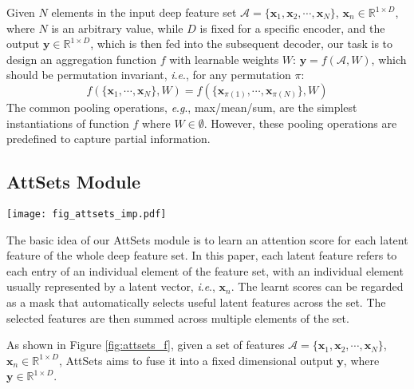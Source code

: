 \documentclass[twocolumn]{svjour3}    \pdfoutput=1
\newcommand{\nickname}{AttSets}
\newcommand{\ie}{\textit{i}.\textit{e}., }
\newcommand{\eg}{\textit{e}.\textit{g}., }
\begin{document}
Given $N$ elements in the input deep feature set $\mathcal{A} = \{\boldsymbol{x}_1, \boldsymbol{x}_2, \cdots, \boldsymbol{x}_N\}$, $\boldsymbol{x}_n \in \mathbb{R}^{1\times D}$, where $N$ is an arbitrary value, while $D$ is fixed for a specific encoder, and the output $\boldsymbol{y} \in \mathbb{R}^{1\times D}$, which is then fed into the subsequent decoder, our task is to design an aggregation function $f$ with learnable weights $\boldsymbol{\mathit{W}}$: $\boldsymbol{y} = f(\mathcal{A}, \boldsymbol{\mathit{W}})$, which should be permutation invariant, \ie for any permutation $\pi$:
\begin{equation}
f(\{ \boldsymbol{x}_1, \cdots, \boldsymbol{x}_N \}, \boldsymbol{\mathit{W}}) = f(\{\boldsymbol{x}_{\pi(1)}, \cdots, \boldsymbol{x}_{\pi(N)} \}, \boldsymbol{\mathit{W}})
\end{equation}
The common pooling operations, \eg max/mean/sum, are the simplest instantiations of function $f$ where $\boldsymbol{\mathit{W}} \in \emptyset$. However, these pooling operations are predefined to capture partial information.

\subsection{\nickname{} Module} \label{sec:design}
\begin{figure*}[t]
\setlength{\abovecaptionskip}{ 1 pt}
\setlength{\belowcaptionskip}{ 1 pt}
\centering
   \texttt{[image: fig\_attsets\_imp.pdf]}
\caption{Implementation of \nickname{} with fully connected layer, 2D ConvNet, and 3D ConvNet. These three variants of \nickname{} can be flexibly plugged into different locations of an existing encoder-decoder network.}
\label{fig:attsets_imp}
\vspace{-0.1cm}
\end{figure*}

The basic idea of our \nickname{} module is to learn an attention score for each latent feature of the whole deep feature set. In this paper, each latent feature refers to each entry of an individual element of the feature set, with an individual element usually represented by a latent vector, \ie $\boldsymbol{x}_n$. The learnt scores can be regarded as a mask that automatically selects useful latent features across the set. The selected features are then summed across multiple elements of the set.

As shown in Figure \ref{fig:attsets_f}, given a set of features $\mathcal{A} = \{\boldsymbol{x}_1, \boldsymbol{x}_2, \cdots, \boldsymbol{x}_N\}$, $\boldsymbol{x}_n \in \mathbb{R}^{1\times D}$, \nickname{} aims to fuse it into a fixed dimensional output $\boldsymbol{y}$, where $\boldsymbol{y} \in \mathbb{R}^{1\times D}$.
\end{document}
